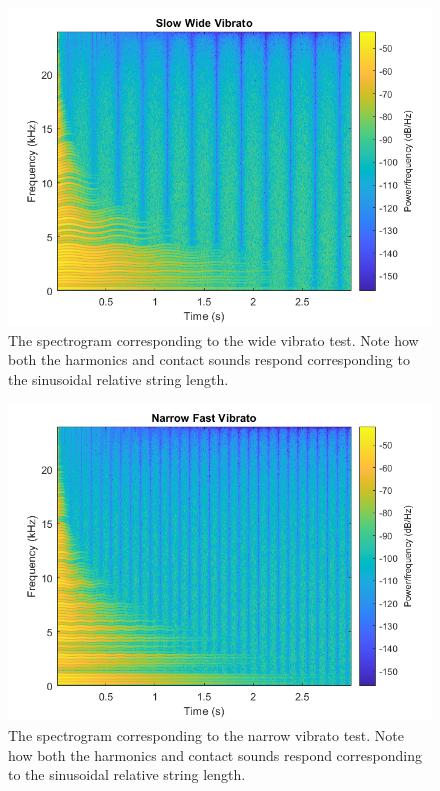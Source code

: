 \documentclass[../main.tex]{subfiles}
\begin{document}
\begin{figure}[h!]
    \centering
    \includegraphics[scale=.55]{./images/plots/VibratoWideSpec.png}
    \caption{The spectrogram corresponding to the wide vibrato test. Note how both the harmonics and contact sounds respond corresponding to the sinusoidal relative string length.}
    \label{fig:VibratoWideSpec}
\end{figure}

\begin{figure}[h!]
    \centering
    \includegraphics[scale=.55]{./images/plots/VibratoNarrowSpec.png}
    \caption{The spectrogram corresponding to the narrow vibrato test. Note how both the harmonics and contact sounds respond corresponding to the sinusoidal relative string length.}
    \label{fig:VibratoNarrowSpec}
\end{figure}
\end{document}
